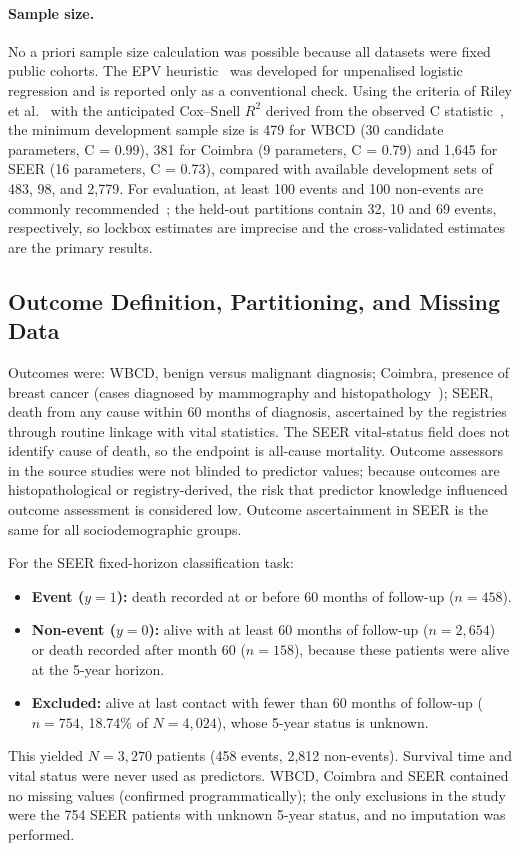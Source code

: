 \documentclass[11pt,a4paper]{article}
\begin{document}
\paragraph{Sample size.} No a priori sample size calculation was possible because all datasets were fixed public cohorts. The EPV heuristic~\cite{steyerberg2019} was developed for unpenalised logistic regression and is reported only as a conventional check. Using the criteria of Riley et al.~\cite{riley2020} with the anticipated Cox--Snell $R^2$ derived from the observed C statistic~\cite{riley2021c}, the minimum development sample size is 479 for WBCD (30 candidate parameters, C = 0.99), 381 for Coimbra (9 parameters, C = 0.79) and 1,645 for SEER (16 parameters, C = 0.73), compared with available development sets of 483, 98, and 2,779. For evaluation, at least 100 events and 100 non-events are commonly recommended~\cite{collins2016,riley2021val}; the held-out partitions contain 32, 10 and 69 events, respectively, so lockbox estimates are imprecise and the cross-validated estimates are the primary results.

\subsection{Outcome Definition, Partitioning, and Missing Data}\label{sec:outcome-definition-partitionin}
Outcomes were: WBCD, benign versus malignant diagnosis; Coimbra, presence of breast cancer (cases diagnosed by mammography and histopathology~\cite{patricio2018}); SEER, death from any cause within 60 months of diagnosis, ascertained by the registries through routine linkage with vital statistics. The SEER vital-status field does not identify cause of death, so the endpoint is all-cause mortality. Outcome assessors in the source studies were not blinded to predictor values; because outcomes are histopathological or registry-derived, the risk that predictor knowledge influenced outcome assessment is considered low. Outcome ascertainment in SEER is the same for all sociodemographic groups.

For the SEER fixed-horizon classification task:
\begin{itemize}
\item \textbf{Event ($y=1$):} death recorded at or before 60 months of follow-up ($n=458$).
\item \textbf{Non-event ($y=0$):} alive with at least 60 months of follow-up ($n=2{,}654$) or death recorded after month 60 ($n=158$), because these patients were alive at the 5-year horizon.
\item \textbf{Excluded:} alive at last contact with fewer than 60 months of follow-up ($n=754$, 18.74\% of $N=4{,}024$), whose 5-year status is unknown.
\end{itemize}
This yielded $N=3{,}270$ patients (458 events, 2,812 non-events). Survival time and vital status were never used as predictors. WBCD, Coimbra and SEER contained no missing values (confirmed programmatically); the only exclusions in the study were the 754 SEER patients with unknown 5-year status, and no imputation was performed.
\end{document}
